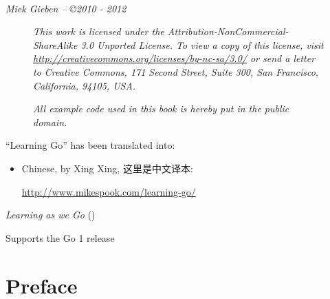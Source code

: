 \documentclass[a4paper,twoside,openleft]{blocksbook}
\begin{document}
\vfill
\begin{center}
    \hspace*{1cm}\\[2.5ex]
    \hspace*{1cm}{\tiny\CcNote{\CcLongnameByNcSa}}
\end{center}
\begin{center}
\hspace*{1cm}\emph{Miek Gieben -- \copyright 2010 - 2012}
\end{center}
\vspace{-3em}

\newpage

\thispagestyle{empty}
\begin{figure}[H]
\begin{center}
\emph{
This work is licensed under the Attribution-NonCommercial-ShareAlike 3.0 Unported License. To
view a copy of this license, visit \url{http://creativecommons.org/licenses/by-nc-sa/3.0/} 
or send a letter
to Creative Commons, 171 Second Street, Suite 300, San Francisco, California, 94105, USA.}
\vspace{2em}

\emph{All example code used in this book is hereby put in the public domain.}
\end{center}

\end{figure}

\begin{center}
``Learning Go'' has been translated into:
\begin{itemize}
\item Chinese, by Xing Xing, 这里是中文译本:

\url{http://www.mikespook.com/learning-go/}
\end{itemize}
\end{center}

\begin{center}
\vfill
\emph{Learning as we Go}
(\emph{\version})

\tiny{Supports the Go 1 release}
\vspace{.2\stockheight}
\end{center}

\clearpage

\tableofcontents*
\listoffigures*
\listofcode* 
\listofex* 
\clearpage

\chapter*{Preface}
\label{chap:preface}

\end{document}
